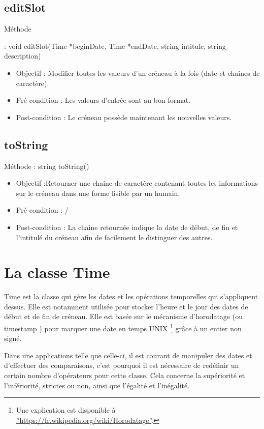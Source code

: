    		\subsection*{editSlot}
            Méthode{ : void editSlot(Time *beginDate, Time *endDate, string intitule, string description)
			\begin{itemize}
				\item Objectif  : Modifier toutes les valeurs d'un créneau à la fois (date et chaines de caractère).
				\item Pré-condition : Les valeurs d'entrée sont au bon format.
				\item Post-condition : Le créneau possède maintenant les nouvelles valeurs.
			\end{itemize}
			
   		\subsection*{toString}
            Méthode : string toString()
			\begin{itemize}
				\item Objectif  :Retourner une chaine de caractère contenant toutes les informations sur le créneau dans une forme lisible par un humain.
				\item Pré-condition : /
				\item Post-condition : La chaine retournée indique la date de début, de fin et l'intitulé du créneau afin de facilement le distinguer des autres.
			\end{itemize}

	\section{La classe Time}  
        Time est la classe qui gère les dates et les opérations temporelles qui s'appliquent dessus. Elle est notamment utilisée pour stocker l'heure et le jour des dates de début et de fin de créneau. Elle est basée sur le mécanisme d'horodatage (ou \og timestamp \fg{}) pour marquer une date en temps UNIX \footnote{Une explication est disponible à \hyperref[cette adresse]{''https://fr.wikipedia.org/wiki/Horodatage''}.} grâce à un entier non signé.
        
        Dans une applications telle que celle-ci, il est courant de manipuler des dates et d'effectuer des comparaisons, c'est pourquoi il est nécessaire de redéfinir un certain nombre d'opérateurs pour cette classe. Cela concerne la supériorité et l'infériorité, strictes ou non, ainsi que l'égalité et l'inégalité.
        
}
